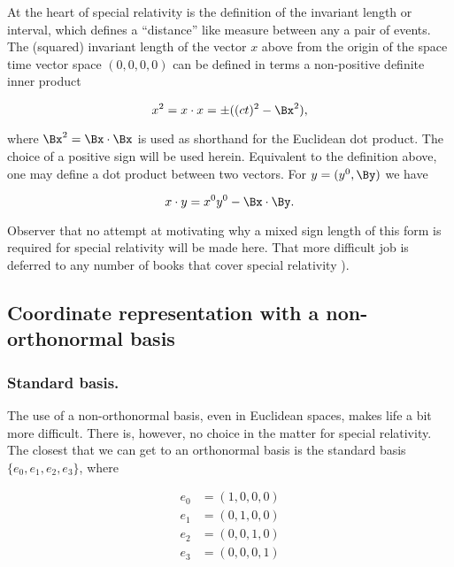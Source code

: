 \documentclass[iop,tighten]{emulateapj}
\begin{document}
At the heart of special relativity is the definition of the invariant length or interval, which defines a ``distance'' like measure between any a pair of events.  The (squared) invariant length of the vector $x$ above from the origin of the space time vector space $(0, 0, 0, 0)$ can be defined in terms a non-positive definite inner product

\begin{equation}\label{eqn:grahamSchmidtLorentz:30}
x^2 = x \cdot x = \pm ((c t)^2 - \Bx^2),
\end{equation}

where $\Bx^2 = \Bx \cdot \Bx$ is used as shorthand for the Euclidean dot product.  The choice of a positive sign will be used herein.  Equivalent to the definition above, one may define a dot product between two vectors.  For $y = (y^0, \By)$ we have

\begin{equation}\label{eqn:grahamSchmidtLorentz:50}
x \cdot y = x^0 y^0 - \Bx \cdot \By.
\end{equation}

Observer that no attempt at motivating why a mixed sign length of this form is required for special relativity will be made here.  That more difficult job is deferred to any number of books that cover special relativity \citep{landau1980classical}).

\subsection{Coordinate representation with a non-orthonormal basis}

\subsubsection{Standard basis.}

The use of a non-orthonormal basis, even in Euclidean spaces, makes life a bit more difficult.  There is, however, no choice in the matter for special relativity.  The closest that we can get to an orthonormal basis is the standard basis $\{e_0, e_1, e_2, e_3\}$, where

\begin{equation}\label{eqn:grahamSchmidtLorentz:70}
\begin{aligned}
e_0 &= (1, 0, 0, 0) \\
e_1 &= (0, 1, 0, 0) \\
e_2 &= (0, 0, 1, 0) \\
e_3 &= (0, 0, 0, 1) 
\end{aligned}
\end{equation}
\end{document}
